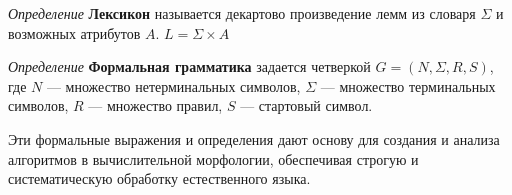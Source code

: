 \textit{Определение} \textbf{Лексикон} называется декартово произведение лемм 
из словаря $\Sigma$ и возможных атрибутов $A$. $L = \Sigma \times A$
 

\textit{Определение} \textbf{Формальная грамматика} задается четверкой
$ G  = \left(N, \Sigma, R, S\right)$, где $N$ — множество нетерминальных символов, 
$\Sigma$ — множество терминальных символов, 
$R$ — множество правил, 
$S$ — стартовый символ.
 
 
 Эти формальные выражения и определения дают основу для создания и анализа алгоритмов в вычислительной морфологии, обеспечивая строгую и систематическую обработку естественного языка.




 
 


